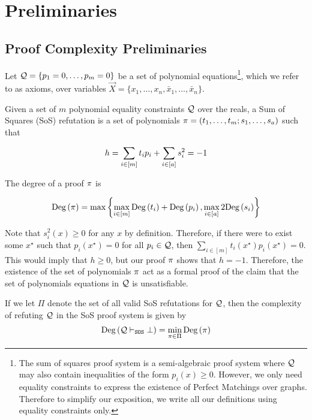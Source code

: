 \documentclass[11pt]{article}
\begin{document}
\section{Preliminaries}
\label{sec:prelims}


\subsection{Proof Complexity Preliminaries}
\label{sec:proof-system-prelims}

Let $\mathcal{Q} = \{ p_1 = 0, \dots, p_m = 0\}$ be a set of polynomial equations\footnote{The sum of squares proof system is a semi-algebraic proof system where $\mathcal{Q}$ may also contain inequalities of the form $p_i(x) \ge 0$. 
However, we only need equality constraints to express the existence of Perfect Matchings over graphs. 
Therefore to simplify our exposition, we write all our definitions using equality constraints only.}, which we refer to as axioms, over variables $\vec{X} = \{x_1, \dots, x_n, \bar{x}_1, \dots, \bar{x}_n\}$.

\begin{definition}\label{def:sum-of-squares} Given a set of $m$ polynomial equality constraints $\mathcal{Q}$ over the reals, a Sum of Squares (SoS) refutation is a set of polynomials $\pi = (t_1, \dots, t_m; s_1, \dots, s_a)$ such that

\[ h = \sum_{i \in [m]} t_ip_i+ \sum_{i \in [a]} s_i^2 = -1\]

The degree of a proof $\pi$ is

\[ \text{Deg}\left(\pi\right) = \max\left\{\max_{i \in [m]} \text{Deg}\left(t_i\right) + \text{Deg}\left(p_i\right), \max_{i \in [a]} 2\text{Deg}\left(s_i\right)\right\}\]


\end{definition}

Note that $s_i^2(x) \ge 0$ for any $x$ by definition. 
Therefore, if there were to exist some $x^{\star}$ such that $p_i(x^{\star}) = 0$ for all $p_i \in \mathcal{Q}$, then $\sum_{i \in [m]} t_i(x^\star)p_i(x^\star) = 0$. 
This would imply that $h \ge 0$, but our proof $\pi$ shows that $h = -1$. 
Therefore, the existence of the set of polynomials $\pi$ act as a formal proof of the claim that the set of polynomials equations in $\mathcal{Q}$ is unsatisfiable.

\begin{definition}
If we let $\Pi$ denote the set of all valid SoS refutations for $\mathcal{Q}$, then the complexity of refuting $\mathcal{Q}$ in the SoS proof system is given by 
\[ \text{Deg}\left(\mathcal{Q} \vdash_{\texttt{SOS}} \bot\right) = \min_{\pi \in \Pi}\text{Deg}\left(\pi\right)\]

\end{definition}
\end{document}
